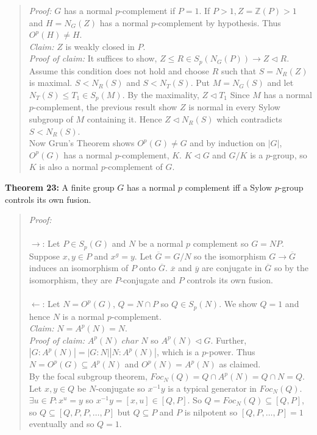 \begin{quote}
\emph{Proof:}  
$G$ has a normal $p$-complement if $P = 1$.  If $P > 1, Z={\mathbb Z}(P) > 1$ and $H= N_G(Z)$ has a normal $p$-complement
by hypothesis.  Thus $O^p(H) \ne H$.\\
\emph{Claim:} $Z$ is weakly closed in $P$.
\\
\emph{Proof of claim:}  It suffices to show, $Z \le R \in S_p(N_G(P)) \rightarrow
Z \lhd R$.  Assume this condition does not hold and choose $R$ such that
$S=N_R(Z)$ is maximal.  $S < N_R(S)$ and $S < N_T(S)$.  Put $M= N_G(S)$ and let
$N_T(S) \le T_1 \in S_p(M)$.  By the maximality, $Z \lhd T_1$  Since $M$ has a normal $p$-complement, the
previous result show $Z$ is normal in every Sylow subgroup of $M$ containing it.  Hence
$Z \lhd N_R(S)$ which contradicts $S < N_R(S)$.
\\
Now Grun's Theorem shows $O^p(G) \ne G$ and by induction on $|G|$, $O^p(G)$ has a normal $p$-complement, $K$.
$K \lhd G$ and $G/K$ is a $p$-group, so $K$ is also a normal $p$-complement of $G$.
\end{quote}
{\bf Theorem 23:} A finite group $G$ has a normal $p$ complement iff a Sylow $p$-group
controls its own fusion.  
\begin{quote}
\emph{Proof:}  
\\
\\
$\rightarrow$:  Let $P \in S_p(G)$ and $N$ be a normal $p$ complement so $G=NP$.
Suppose $x, y \in P$ and $x^g=y$.  Let ${\overline G}= G/N$ so the isomorphism
$G \rightarrow {\overline G}$ induces an isomorphism of $P$ onto ${\overline G}$.
${\overline x}$ and
${\overline y}$ are conjugate in 
${\overline G}$ so by the isomorphism, they are $P$-conjugate and $P$ controls its own
fusion.
\\
\\
$\leftarrow$:  Let $N= O^p(G)$, $Q= N \cap P$ so $Q \in S_p(N)$.  We show $Q=1$ and hence
$N$ is a normal $p$-complement.
\\
\emph{Claim:} $N= A^p(N)=N$.
\\
\emph{Proof of claim:}
$A^p(N) \; char \; N$ so $A^p(N) \lhd G$.  Further,
$|G:A^p(N)|= |G:N||N:A^p(N)|$, which is a $p$-power.  Thus
$N= O^p(G) \subseteq A^p(N)$ and $O^p(N)=A^p(N)$ as claimed.
\\
By the focal subgroup theorem,  $Foc_N(Q)= Q \cap A^p(N)= Q \cap N = Q$.  Let
$x, y \in Q$ be $N$-conjugate so $x^{-1}y$ is a typical generator in $Foc_N(Q)$.
$\exists u \in P: x^u=y$ so $x^{-1}y = [x,u] \in [Q, P]$.  So
$Q= Foc_N(Q) \subseteq [Q, P]$, so $Q \subseteq [Q, P, P, \ldots ,P]$ but
$Q \subseteq P$ and $P$ is nilpotent so $[Q, P, \ldots , P]= 1$ eventually and so
$Q= 1$.
\end{quote}

